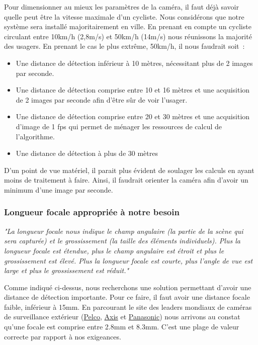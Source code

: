 Pour dimensionner au mieux les paramètres de la caméra, il faut déjà savoir quelle peut être la vitesse maximale d’un cycliste. 
Nous considérons que notre système sera installé majoritairement en ville. 
En prenant en compte un cycliste circulant entre 10km/h (2,8m/s) et 50km/h (14m/s) nous réunissons la majorité des usagers. 
En prenant le cas le plus extrême, 50km/h, il nous faudrait soit :
\begin{itemize}
    \item Une distance de détection inférieur à 10 mètres, nécessitant plus de 2 images par seconde.
    \item Une distance de détection comprise entre 10 et 16 mètres et une acquisition de 2 images par seconde afin d’être sûr de voir l’usager.
    \item Une distance de détection comprise entre 20 et 30 mètres et une acquisition d’image de 1 fps qui permet de ménager les ressources de calcul de l’algorithme.
    \item Une distance de détection à plus de 30 mètres
\end{itemize}
D'un point de vue matériel, il parait plus évident de soulager les calculs en ayant moins de traitement à faire. 
Ainsi, il faudrait orienter la caméra afin d'avoir un minimum d'une image par seconde.

\subsubsection{Longueur focale appropriée à notre besoin}
\label{sec:camera_focale}

\textit{"La longueur focale nous indique le champ angulaire (la partie de la scène qui sera capturée) 
et le grossissement (la taille des éléments individuels). 
Plus la longueur focale est étendue, plus le champ angulaire est étroit et plus le grossissement est élevé. 
Plus la longueur focale est courte, plus l’angle de vue est large et plus le grossissement est réduit."} \cite{focale}

Comme indiqué ci-dessus, nous recherchons une solution permettant d'avoir une distance de détection importante.
Pour ce faire, il faut avoir une distance focale faible, inférieur à 15mm.
En parcourant le site des leaders mondiaux de caméras de surveillance extérieur 
(\href{https://media.pelco.com/wp-content/uploads/2020/11/10145554/SC-2042-Quick-Reference-Guide-update-QRG-April-2020.pdf}{Pelco}, 
\href{https://www.axis.com/fr-fr/products/axis-q16-series}{Axis} et
\href{https://business.panasonic.fr/solutions-de-securite/cam%C3%A9ra-bullet-ext%C3%A9rieure-4k-plateforme-ouverte-intelligence-artificielle/wv-x1571ln}{Panasonic})
nous arrivons au constat qu'une focale est comprise entre 2.8mm et 8.3mm.
C'est une plage de valeur correcte par rapport à nos exigeances.

